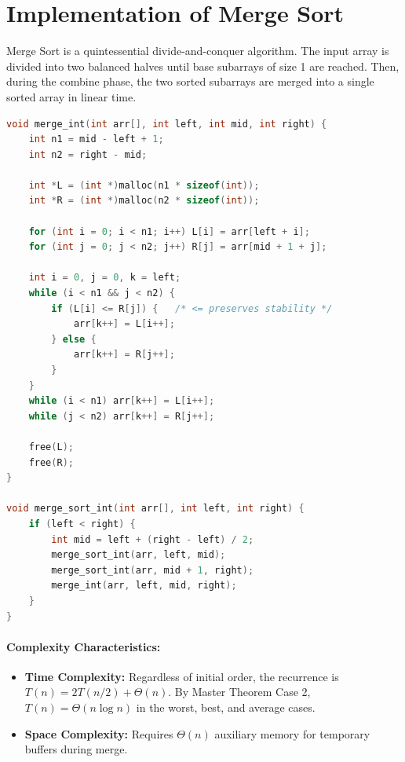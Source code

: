 \documentclass[12pt,a4paper]{article}
\theoremstyle{plain}
\theoremstyle{definition}
\theoremstyle{remark}
\begin{document}
\section{Implementation of Merge Sort}

Merge Sort is a quintessential divide-and-conquer algorithm. The input array is divided into two balanced halves until base subarrays of size 1 are reached. Then, during the combine phase, the two sorted subarrays are merged into a single sorted array in linear time.

\begin{lstlisting}[language=C, caption={Merge Sort implementation in C (\texttt{merge\_sort.c})}]
void merge_int(int arr[], int left, int mid, int right) {
    int n1 = mid - left + 1;
    int n2 = right - mid;

    int *L = (int *)malloc(n1 * sizeof(int));
    int *R = (int *)malloc(n2 * sizeof(int));

    for (int i = 0; i < n1; i++) L[i] = arr[left + i];
    for (int j = 0; j < n2; j++) R[j] = arr[mid + 1 + j];

    int i = 0, j = 0, k = left;
    while (i < n1 && j < n2) {
        if (L[i] <= R[j]) {   /* <= preserves stability */
            arr[k++] = L[i++];
        } else {
            arr[k++] = R[j++];
        }
    }
    while (i < n1) arr[k++] = L[i++];
    while (j < n2) arr[k++] = R[j++];

    free(L);
    free(R);
}

void merge_sort_int(int arr[], int left, int right) {
    if (left < right) {
        int mid = left + (right - left) / 2;
        merge_sort_int(arr, left, mid);
        merge_sort_int(arr, mid + 1, right);
        merge_int(arr, left, mid, right);
    }
}
\end{lstlisting}

\paragraph{Complexity Characteristics:}
\begin{itemize}
    \item \textbf{Time Complexity:} Regardless of initial order, the recurrence is $T(n) = 2 T(n/2) + \Theta(n)$. By Master Theorem Case 2, $T(n) = \Theta(n \log n)$ in the worst, best, and average cases.
    \item \textbf{Space Complexity:} Requires $\Theta(n)$ auxiliary memory for temporary buffers during merge.
\end{itemize}
\end{document}
